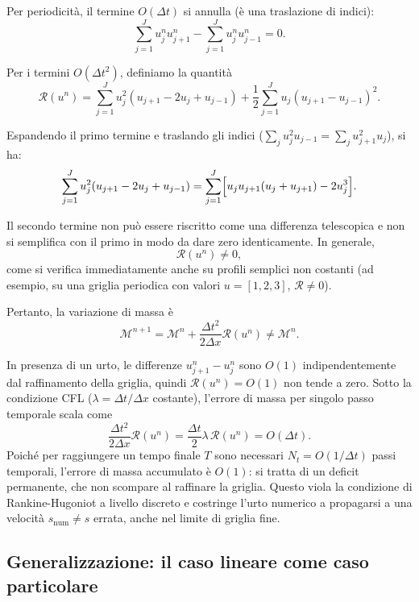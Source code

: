 \documentclass[12pt]{article}
\begin{document}
Per periodicità, il termine \(O(\Delta t)\) si annulla (è una traslazione di indici):
\[
\sum_{j=1}^J u_j^nu_{j+1}^n - \sum_{j=1}^J u_j^nu_{j-1}^n = 0.
\]

Per i termini \(O(\Delta t^2)\), definiamo la quantità
\[
\mathcal{R}(u^n) = 
\sum_{j=1}^J u_j^2 (u_{j+1} - 2u_j + u_{j-1}) 
+ \frac{1}{2} \sum_{j=1}^J u_j (u_{j+1} - u_{j-1})^2.
\]

Espandendo il primo termine e traslando gli indici (\(\sum_j u_j^2 u_{j-1} = \sum_j u_{j+1}^2 u_j\)), si ha:
\[
\sum_{j=1}^J u_j^2 (u_{j+1} - 2u_j + u_{j-1}) 
= \sum_{j=1}^J \Bigl[u_j u_{j+1}(u_j+u_{j+1}) - 2u_j^3\Bigr].
\]

Il secondo termine non può essere riscritto come una differenza telescopica e non si semplifica con il primo in modo da dare zero identicamente. In generale,
\[
\mathcal{R}(u^n) \neq 0,
\]
come si verifica immediatamente anche su profili semplici non costanti (ad esempio, su una griglia periodica con valori \(u=[1,2,3]\), \(\mathcal{R}\neq 0\)). 

Pertanto, la variazione di massa è
\[
\mathcal{M}^{n+1} = \mathcal{M}^n + \frac{\Delta t^2}{2\Delta x}\mathcal{R}(u^n) \neq \mathcal{M}^n.
\]

In presenza di un urto, le differenze \(u_{j+1}^n-u_j^n\) sono \(O(1)\) indipendentemente dal raffinamento della griglia, quindi \(\mathcal{R}(u^n)=O(1)\) non tende a zero. Sotto la condizione CFL (\(\lambda=\Delta t/\Delta x\) costante), l'errore di massa per singolo passo temporale scala come
\[
\frac{\Delta t^2}{2\Delta x}\mathcal{R}(u^n) = \frac{\Delta t}{2}\lambda\,\mathcal{R}(u^n) = O(\Delta t).
\]
Poiché per raggiungere un tempo finale \(T\) sono necessari \(N_t = O(1/\Delta t)\) passi temporali, l'errore di massa accumulato è \(O(1)\): si tratta di un deficit permanente, che non scompare al raffinare la griglia. Questo viola la condizione di Rankine-Hugoniot a livello discreto e costringe l'urto numerico a propagarsi a una velocità \(s_{\text{num}}\neq s\) errata, anche nel limite di griglia fine.
\newpage

\subsection{Generalizzazione: il caso lineare come caso particolare}
\end{document}
